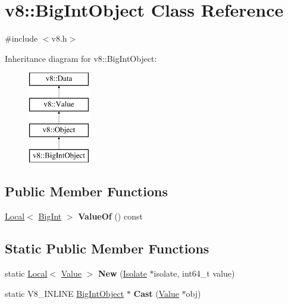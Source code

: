 \hypertarget{classv8_1_1BigIntObject}{}\section{v8\+:\+:Big\+Int\+Object Class Reference}
\label{classv8_1_1BigIntObject}


{\ttfamily \#include $<$v8.\+h$>$}

Inheritance diagram for v8\+:\+:Big\+Int\+Object\+:\begin{figure}[H]
\begin{center}
\leavevmode
\includegraphics[height=4.000000cm]{classv8_1_1BigIntObject}
\end{center}
\end{figure}
\subsection*{Public Member Functions}
\begin{DoxyCompactItemize}
\item 
\mbox{\label{classv8_1_1BigIntObject_a54afb6996195d90226b1b569ca3260e4}} 
\mbox{\hyperlink{classv8_1_1Local}{Local}}$<$ \mbox{\hyperlink{classv8_1_1BigInt}{Big\+Int}} $>$ {\bfseries Value\+Of} () const
\end{DoxyCompactItemize}
\subsection*{Static Public Member Functions}
\begin{DoxyCompactItemize}
\item 
\mbox{\label{classv8_1_1BigIntObject_aeadcd7f6344bad684c97f300715064ee}} 
static \mbox{\hyperlink{classv8_1_1Local}{Local}}$<$ \mbox{\hyperlink{classv8_1_1Value}{Value}} $>$ {\bfseries New} (\mbox{\hyperlink{classv8_1_1Isolate}{Isolate}} $\ast$isolate, int64\+\_\+t value)
\item 
\mbox{\label{classv8_1_1BigIntObject_a0d860e8c61719574ae4517248f4ee667}} 
static V8\+\_\+\+I\+N\+L\+I\+NE \mbox{\hyperlink{classv8_1_1BigIntObject}{Big\+Int\+Object}} $\ast$ {\bfseries Cast} (\mbox{\hyperlink{classv8_1_1Value}{Value}} $\ast$obj)
\end{DoxyCompactItemize}


